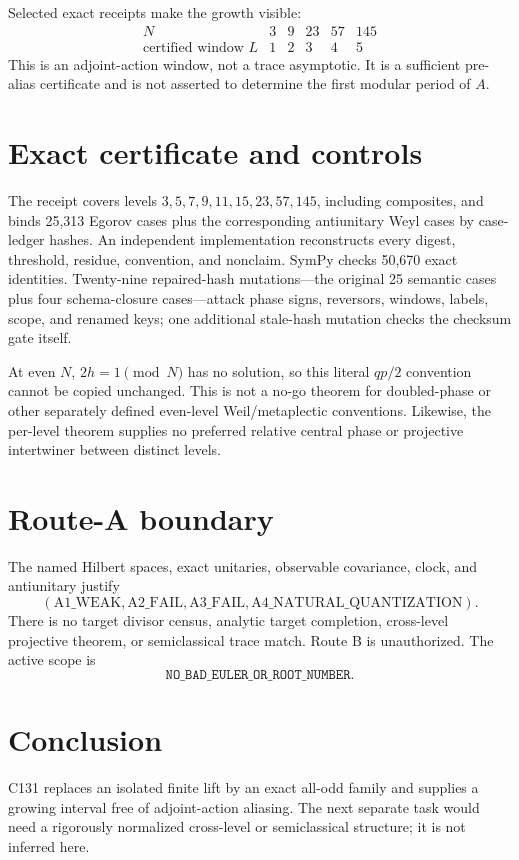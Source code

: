\documentclass[11pt]{article}
\begin{document}
Selected exact receipts make the growth visible:
\[
\begin{array}{c|ccccc}
N&3&9&23&57&145\\ \hline
\text{certified window }L&1&2&3&4&5
\end{array}
\]
This is an adjoint-action window, not a trace asymptotic.
It is a sufficient pre-alias certificate and is not asserted to determine the
first modular period of $A$.

\section{Exact certificate and controls}

The receipt covers levels $3,5,7,9,11,15,23,57,145$, including composites,
and binds 25,313 Egorov cases plus the corresponding antiunitary Weyl cases by
case-ledger hashes.  An independent implementation reconstructs every digest,
threshold, residue, convention, and nonclaim.  SymPy checks 50,670 exact
identities.  Twenty-nine repaired-hash mutations---the original 25 semantic
cases plus four schema-closure cases---attack phase signs, reversors, windows,
labels, scope, and renamed keys; one additional stale-hash mutation checks the
checksum gate itself.

At even $N$, $2h=1\pmod N$ has no solution, so this literal $qp/2$ convention
cannot be copied unchanged.  This is not a no-go theorem for doubled-phase or
other separately defined even-level Weil/metaplectic conventions.  Likewise,
the per-level theorem supplies no preferred relative central phase or
projective intertwiner between distinct levels.

\section{Route-A boundary}

The named Hilbert spaces, exact unitaries, observable covariance, clock, and
antiunitary justify
\[
 (\mathrm{A1\_WEAK},\mathrm{A2\_FAIL},\mathrm{A3\_FAIL},
  \mathrm{A4\_NATURAL\_QUANTIZATION}).
\]
There is no target divisor census, analytic target completion, cross-level
projective theorem, or semiclassical trace match.  Route B is unauthorized.
The active scope is
\[
 \texttt{NO\_BAD\_EULER\_OR\_ROOT\_NUMBER}.
\]

\section{Conclusion}

C131 replaces an isolated finite lift by an exact all-odd family and supplies
a growing interval free of adjoint-action aliasing.  The next separate task
would need a rigorously normalized cross-level or semiclassical structure; it
is not inferred here.
\end{document}
